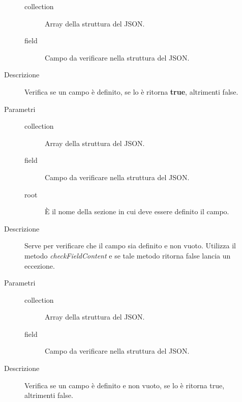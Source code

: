 \begin{description}
\begin{mldescription}
\begin{description}
     			\begin{description}
     				\item[collection]
     			     Array della struttura del JSON.
     			    \item[field]
     			     Campo da verificare nella struttura del JSON.
     			\end{description}
     		\item[Descrizione]
     		Verifica se un campo è definito, se lo è ritorna \textbf{true}, altrimenti false.
  \end{description}
  \hfill
 \begin{description}
     		\item[Parametri] \hfill
     			\begin{description}
     				\item[collection]
     				 Array della struttura del JSON.
     				\item[field]
     				 Campo da verificare nella struttura del JSON.
     				\item[root]
     				 \`{E} il nome della sezione in cui deve essere definito il campo.
     			\end{description}
     		\item[Descrizione]
     		Serve per verificare che il campo sia definito e non vuoto. Utilizza il metodo \textit{checkFieldContent} e se tale metodo ritorna false lancia un eccezione.
  \end{description}
  \hfill 
 \begin{description}
     		\item[Parametri] \hfill
     			\begin{description}
     				\item[collection]
     				 Array della struttura del JSON.
       			    \item[field]
       			     Campo da verificare nella struttura del JSON.
     			\end{description}
     		\item[Descrizione]
     		Verifica se un campo è definito e non vuoto, se lo è ritorna true, altrimenti false.
  \end{description}
  

\end{mldescription}
\end{description}
